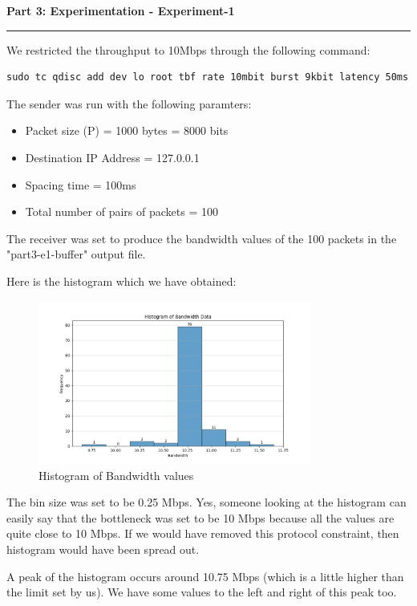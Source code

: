 \documentclass[a4paper,12pt]{article}
\newenvironment{solution}[2][]{%
    \begin{mdframed}[linecolor=blue!70!black, linewidth=2pt, roundcorner=10pt, backgroundcolor=yellow!10!white, skipabove=12pt, skipbelow=12pt]%
        \textbf{\large #2}
        \par\noindent\rule{\textwidth}{0.4pt}
}{
    \end{mdframed}
}
\begin{document}
\begin{solution}{Part 3: Experimentation - Experiment-1}
    We restricted the throughput to 10Mbps through the following command:
\begin{lstlisting}[caption=Restricting the throughput to 10Mbps]
sudo tc qdisc add dev lo root tbf rate 10mbit burst 9kbit latency 50ms
\end{lstlisting}

The sender was run with the following paramters:
\begin{itemize}
    \item Packet size (P) = 1000 bytes = 8000 bits
    \item Destination IP Address = 127.0.0.1
    \item Spacing time = 100ms
    \item Total number of pairs of packets = 100
\end{itemize}

The receiver was set to produce the bandwidth values of the 100 packets in the "part3-e1-buffer" output file.


Here is the histogram which we have obtained:

\begin{figure}[H]
    \centering
    \includegraphics[width=0.8\textwidth]{bandwidth_histogram.png}
    \caption{Histogram of Bandwidth values}
\end{figure}


The bin size was set to be 0.25 Mbps. Yes, someone looking at the histogram can easily say that the bottleneck was set to be 10 Mbps because all the values are quite close to 10 Mbps. If we would have removed this protocol constraint, then histogram would have been spread out.


A peak of the histogram occurs around 10.75 Mbps (which is a little higher than the limit set by us). We have some values to the left and right of this peak too.
\end{solution}
\end{document}
